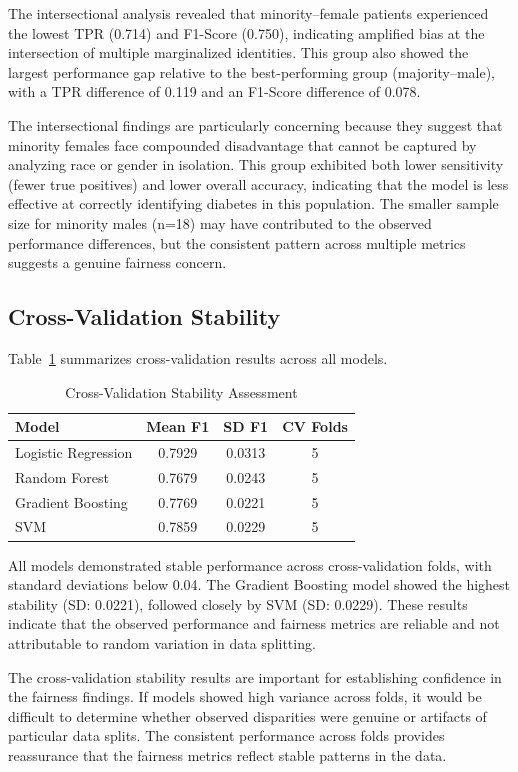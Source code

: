 The intersectional analysis revealed that minority--female patients 
experienced the lowest TPR (0.714) and F1-Score (0.750), indicating 
amplified bias at the intersection of multiple marginalized identities. 
This group also showed the largest performance gap relative to the 
best-performing group (majority--male), with a TPR difference of 0.119 
and an F1-Score difference of 0.078.

The intersectional findings are particularly concerning because they 
suggest that minority females face compounded disadvantage that cannot 
be captured by analyzing race or gender in isolation. This group 
exhibited both lower sensitivity (fewer true positives) and lower overall 
accuracy, indicating that the model is less effective at correctly 
identifying diabetes in this population. The smaller sample size for 
minority males (n=18) may have contributed to the observed performance 
differences, but the consistent pattern across multiple metrics suggests 
a genuine fairness concern.

\subsection{Cross-Validation Stability}

Table~\ref{tab:cross_validation} summarizes cross-validation results 
across all models.

\begin{table}[H]
\centering
\caption{Cross-Validation Stability Assessment}
\begin{tabular}{lccc}
\toprule
\textbf{Model} & \textbf{Mean F1} & \textbf{SD F1} & \textbf{CV Folds} \\
\midrule
Logistic Regression & 0.7929 & 0.0313 & 5 \\
Random Forest & 0.7679 & 0.0243 & 5 \\
Gradient Boosting & 0.7769 & 0.0221 & 5 \\
SVM & 0.7859 & 0.0229 & 5 \\
\bottomrule
\end{tabular}
\label{tab:cross_validation}
\end{table}

All models demonstrated stable performance across cross-validation folds, 
with standard deviations below 0.04. The Gradient Boosting model showed 
the highest stability (SD: 0.0221), followed closely by SVM (SD: 0.0229). 
These results indicate that the observed performance and fairness metrics 
are reliable and not attributable to random variation in data splitting.

The cross-validation stability results are important for establishing 
confidence in the fairness findings. If models showed high variance 
across folds, it would be difficult to determine whether observed 
disparities were genuine or artifacts of particular data splits. The 
consistent performance across folds provides reassurance that the fairness 
metrics reflect stable patterns in the data.
